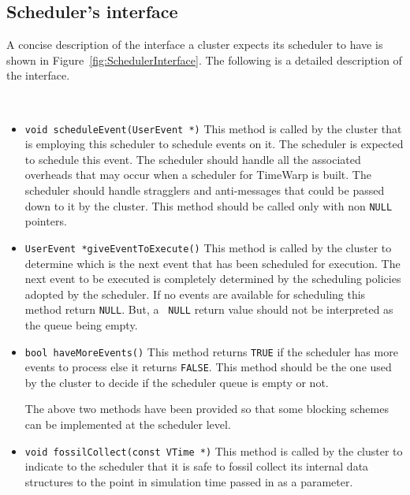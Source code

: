 \subsection{Scheduler's interface}

A concise description of the interface a cluster expects its scheduler to
have is shown in Figure~\ref{fig:SchedulerInterface}. The following is a
detailed description of the interface.

\begin{figure*}
\begin{center}
  \ 
\end{center}
\caption{The interface a Scheduler should
  provide.}\label{fig:SchedulerInterface}
\end{figure*}

\begin{itemize}
\item {\tt void scheduleEvent(UserEvent *)} This method is called by the
  cluster that is employing this scheduler to schedule events on it. The
  scheduler is expected to schedule this event. The scheduler should
  handle all the associated overheads that may occur when a scheduler for
  TimeWarp is built. The scheduler should handle stragglers and
  anti-messages that could be passed down to it by the cluster. This
  method should be called only with non {\tt NULL} pointers.

\item {\tt UserEvent *giveEventToExecute()} This method is called by the
  cluster to determine which is the next event that has been scheduled for
  execution. The next event to be executed is completely determined by the
  scheduling policies adopted by the scheduler. If no events are
  available for scheduling this method return {\tt NULL}. But, a {\tt
    NULL} return value should not be interpreted as the queue being
  empty.

\item {\tt bool haveMoreEvents()} This method returns {\tt TRUE} if the
  scheduler has more events to process else it returns {\tt FALSE}. This
  method should be the one used by the cluster to decide if the scheduler
  queue is empty or not.

  The above two methods have been provided so that some blocking schemes
  can be implemented at the scheduler level.

\item {\tt void fossilCollect(const VTime *)} This method is called by
  the cluster to indicate to the scheduler that it is safe to fossil
  collect its internal data structures to the point in simulation time
  passed in as a parameter.
\end{itemize}

